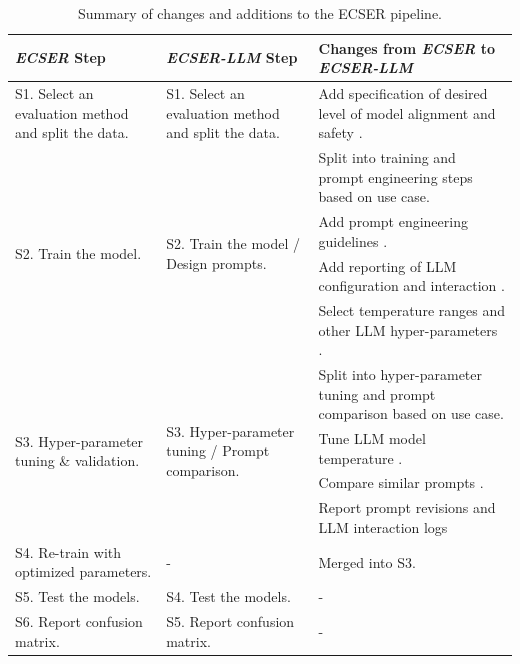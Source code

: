 \documentclass[a4paper]{article}
\newcommand{\newecser}{\textit{ECSER-LLM} }
\begin{document}
\begin{table}[H]
	\centering
	\caption{Summary of changes and additions to the ECSER pipeline.}
	\begin{tabularx}{\textwidth}{|p{3cm}|p{3.5cm}|X|}
		\hline
		\textbf{\textit{ECSER} Step} & \textbf{\newecser Step} & \textbf{Changes from \textit{ECSER} to \newecser} \\ \hline
		
		S1. Select an evaluation method and split the data.
		& S1. Select an evaluation method and split the data.
		& Add specification of desired level of model alignment and safety \cite{guo2023survey}. \\ \hline
		
		\multirow[c]{4}{*}{\parbox{3cm}{S2. Train the model.}}
		& \multirow[c]{4}{*}{\parbox{3.5cm}{S2. Train the model / Design prompts.}}
		& Split into training and prompt engineering steps based on use case. \\
		& & Add prompt engineering guidelines \cite{arvidsson2023,Marvin2024}.\\
		& & Add reporting of LLM configuration and interaction \cite{baltes2025guidelinesempiricalstudiessoftware}. \\ 
		& & Select temperature ranges and other LLM hyper-parameters \cite{peeperkorn2024,baltes2025guidelinesempiricalstudiessoftware}. \\ \hline
		
		\multirow[c]{4}{*}{\parbox{3cm}{S3. Hyper-parameter tuning \& validation.}}
		& \multirow[c]{4}{*}{\parbox{3.5cm}{S3. Hyper-parameter tuning / Prompt comparison.}}
		& Split into hyper-parameter tuning and prompt comparison based on use case. \\
		& & Tune LLM model temperature \cite{peeperkorn2024}. \\ 
		& & Compare similar prompts \cite{ronanki2023}. \\ 
		& & Report prompt revisions and LLM interaction logs \cite{baltes2025guidelinesempiricalstudiessoftware} \\ \hline
		
		S4. Re-train with optimized parameters. 
		& -
		& Merged into S3.\\ \hline
		
		S5. Test the models.
		& S4. Test the models.
		& - \\ \hline
		
		S6. Report confusion matrix.
		& S5. Report confusion matrix.
		& - \\ \hline
		

\end{tabularx}
\end{table}
\end{document}
